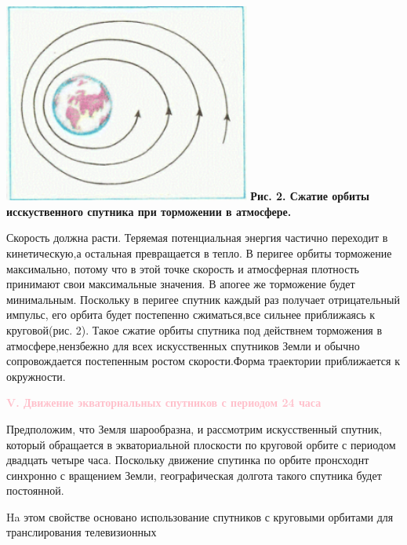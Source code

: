 \leftskip=0cm \rightskip=0cm
\begin{minipage}{8cm}
	
	\includegraphics[width=230pt]{img/picture2.png}
	\fontsize{11}{8}
	\textbf{Рис. 2. Сжатие орбиты исскуственного спутника при торможении в атмосфере.}
	
	
	\fontsize{14}{10}\selectfont
	Скорость должна расти. Теряемая потенциальная энергия частично переходит в кинетическую,а остальная превращается в тепло. В перигее орбиты торможение максимально, потому что	в этой точке скорость и атмосферная плотность принимают свои максимальные значения. В апогее же торможение будет минимальным. Поскольку в перигее спутник каждый раз получает отрицательный импульс, его орбита будет постепенно сжиматься,все сильнее приближаясь к круговой(рис. 2). Такое сжатие орбиты спутника под действнем торможения в атмосфере,нензбежно для всех искусственных спутников Земли и обычно	сопровождается постепенным ростом скорости.Форма траектории приближается к окружности.
	

\begin{center}
	\textcolor{pink}{\textbf{V. Движение экваторнальных
	спутников с периодом 24 часа}}
\end{center}
	\hspace{10mm}Предположим, что Земля шарообразна, и рассмотрим искусственный спутник, который обращается в экваториальной плоскости по круговой орбите с периодом двадцать четыре часа. Поскольку движение спутинка по орбите пронсходнт синхронно с вращением Земли, географическая долгота такого спутника будет постоянной.
	
	\hspace{10mm}Ha этом свойстве основано использование спутников с круговыми орбитами для транслирования телевизионных
	
	
\end{minipage}


